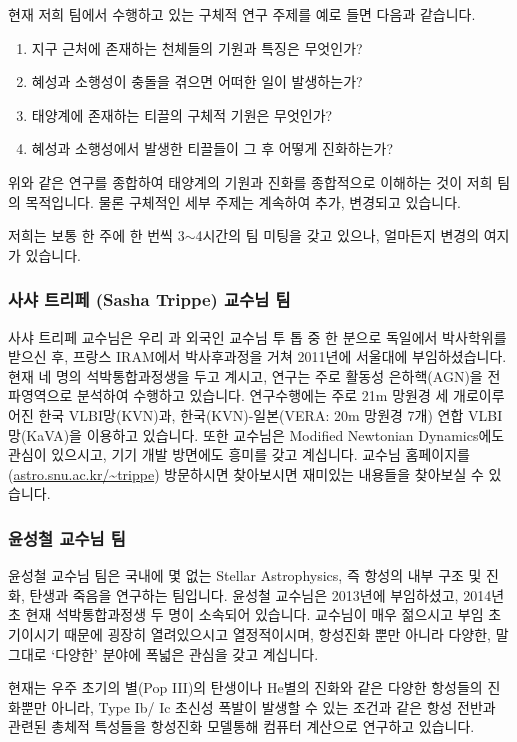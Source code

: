 현재 저희 팀에서 수행하고 있는 구체적 연구 주제를 예로 들면 다음과 같습니다.
\begin{enumerate}
\item 지구 근처에 존재하는 천체들의 기원과 특징은 무엇인가?
\item 혜성과 소행성이 충돌을 겪으면 어떠한 일이 발생하는가?
\item 태양계에 존재하는 티끌의 구체적 기원은 무엇인가?
\item 혜성과 소행성에서 발생한 티끌들이 그 후 어떻게 진화하는가?
\end{enumerate}
위와 같은 연구를 종합하여 태양계의 기원과 진화를 종합적으로 이해하는 것이 저희 팀의 목적입니다. 물론 구체적인 세부 주제는 계속하여 추가, 변경되고 있습니다.

저희는 보통 한 주에 한 번씩 3$\sim$4시간의 팀 미팅을 갖고 있으나, 얼마든지 변경의 여지가 있습니다.

\subsubsection{사샤 트리페 (Sasha Trippe) 교수님 팀}
사샤 트리페 교수님은 우리 과 외국인 교수님 투 톱 중 한 분으로 독일에서 박사학위를
받으신 후, 프랑스 IRAM에서 박사후과정을 거쳐 2011년에 서울대에
부임하셨습니다. 현재 네 명의 석박통합과정생을 두고 계시고, 연구는 주로 활동성
은하핵(AGN)을 전파영역으로 분석하여 수행하고 있습니다. 연구수행에는 주로 21m
망원경 세 개로이루어진 한국 VLBI망(KVN)과, 한국(KVN)-일본(VERA: 20m 망원경 7개)
연합 VLBI망(KaVA)을 이용하고 있습니다. 또한 교수님은 Modified Newtonian
Dynamics에도 관심이 있으시고, 기기 개발 방면에도 흥미를 갖고 계십니다. 교수님
홈페이지를(\url{astro.snu.ac.kr/~trippe}) 방문하시면 찾아보시면 재미있는 내용들을
찾아보실 수 있습니다.


\subsubsection{윤성철 교수님 팀}
윤성철 교수님 팀은 국내에 몇 없는 Stellar Astrophysics, 즉 항성의 내부 구조 및 진화, 탄생과 죽음을 연구하는 팀입니다. 윤성철 교수님은 2013년에 부임하셨고, 2014년 초 현재 석박통합과정생 두 명이 소속되어 있습니다. 교수님이 매우 젊으시고 부임 초기이시기 때문에 굉장히 열려있으시고 열정적이시며, 항성진화 뿐만 아니라 다양한, 말그대로 `다양한’ 분야에 폭넓은 관심을 갖고 계십니다.

현재는 우주 초기의 별(Pop III)의 탄생이나 He별의 진화와 같은 다양한 항성들의 진화뿐만 아니라, Type Ib/ Ic 초신성 폭발이 발생할 수 있는 조건과 같은 항성 전반과 관련된 총체적 특성들을 항성진화 모델통해 컴퓨터 계산으로 연구하고 있습니다. 

